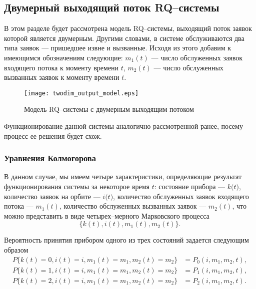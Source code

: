 \subsection{Двумерный выходящий поток RQ--системы} \label{section_simple_twodim}
В этом разделе будет рассмотрена модель RQ--системы, выходящий поток заявок которой является двумерным. Другими словами, в системе обслуживаются два типа заявок --- пришедшее извне и вызванные. Исходя из этого добавим к имеющимся обозначениям следующие: \textit{$m_{1}(t)$} --- число обслуженных заявок входящего потока к моменту времени $\textit{t}$, \textit{$m_{2}(t)$} — число обслуженных вызванных заявок к моменту времени $\textit{t}$.
\begin{figure}[H]
	\centering
	\texttt{[image: twodim\_output\_model.eps]}
	\caption{Модель RQ--системы с двумерным выходящим потоком}
	\label{twodim_output_model_fig}
\end{figure}
Функционирование данной системы аналогично рассмотренной ранее, посему процесс ее решения будет схож. 
\subsubsection{Уравнения Колмогорова}
В данном случае, мы имеем четыре характеристики, определяющие результат функционирования системы за некоторое время $t$: состояние прибора --- $\textit{k(t)}$, количество заявок на орбите --- $\textit{i(t)}$, количество обслуженных заявок входящего потока --- $m_{1}(t)$, количество обслуженных вызванных заявок --- $m_{2}(t)$,  что можно представить в виде четырех--мерного Марковского процесса
\begin{equation*}
	\{k(t),i(t),m_{1}(t),m_{2}(t)\}.
\end{equation*}

Вероятность принятия прибором одного из трех состояний задается следующим образом
\begin{equation*}
	\begin{split}
		P\{k(t)=0,i(t)=i,m_{1}(t)=m_{1},m_{2}(t)=m_{2}\} &=P_{0}(i,m_{1},m_{2},t),\\
		P\{k(t)=1,i(t)=i,m_{1}(t)=m_{1},m_{2}(t)=m_{2}\} &=P_{1}(i,m_{1},m_{2},t),\\
		P\{k(t)=2,i(t)=i,m_{1}(t)=m_{1},m_{2}(t)=m_{2}\} &=P_{2}(i,m_{1},m_{2},t).
	\end{split}
\end{equation*}

